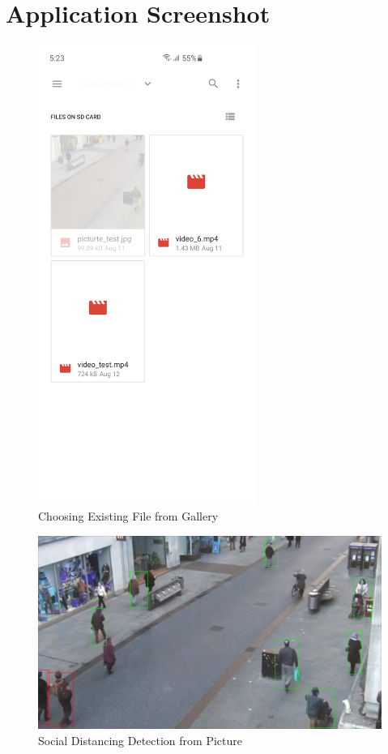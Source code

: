 \chapter{Application Screenshot}\label{intro}

    \begin{figure}[!ht]
        \centering
        \includegraphics[width=2.8in]{images/appendix-a/sh-choosing.jpg}
        \caption{Choosing Existing File from Gallery}
        \label{appendix:result}
    \end{figure}

    \begin{figure}[!ht]
        \includegraphics[width=6in]{images/chapter5/application/picture-detection.jpg}
        \caption{Social Distancing Detection from Picture}
        \label{result:picture}
    \end{figure}


